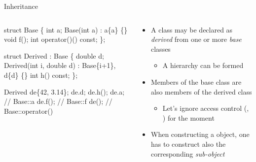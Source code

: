 \begin{frame}[fragile]{Inheritance}

  \begin{columns}[T]
    \begin{column}{.4\textwidth}
  \begin{codeblock}
struct Base \{
  int a;
  Base(int a) : a\{a\} \{\}
  void f();
  int operator()() const;
\};

struct Derived \alert{: Base} \{
  double d;
  Derived(int i, double d)
    : \alert{Base}\{i+1\}, d\{d\} \{\}
  int h() const;
\};

Derived de\{42, 3.14\};
de.d;
de.h();
de.a;   // Base::a
de.f(); // Base::f
de();   // Base::operator()\end{codeblock}
   
    \end{column}
    \begin{column}{.6\textwidth}

      \begin{itemize}
      \item A class may be declared as \textit{derived} from one or more
        \textit{base} classes
        \begin{itemize}
        \item A hierarchy can be formed
        \end{itemize}
      \item Members of the base class are also members of the derived class
        \begin{itemize}
        \item Let's ignore access control (, ) for
          the moment
        \end{itemize}
      \item When constructing a  object, one has to construct also
        the corresponding  \textit{sub-object}
      \end{itemize}
    \end{column}
  \end{columns}

\end{frame}

